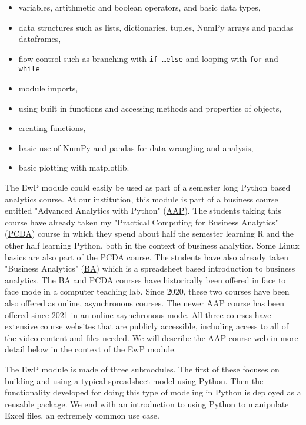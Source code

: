 \documentclass[ited,blindrev]{informs3}              %
\begin{document}
\begin{itemize}
	\item variables, artithmetic and boolean operators, and basic data types,
	\item data structures such as lists, dictionaries, tuples, NumPy arrays and pandas dataframes,
	\item flow control such as branching with \texttt{if \ldots else} and looping with \texttt{for} and \texttt{while}
	\item module imports,
	\item using built in functions and accessing methods and properties of objects,
	\item creating functions,
	\item basic use of NumPy and pandas for data wrangling and analysis,
	\item basic plotting with matplotlib.
\end{itemize}

The EwP module could easily be used as part of a semester long Python based analytics course. At our institution, this module is part of a business course entitled "Advanced Analytics with Python" (\href{http://www.sba.oakland.edu/faculty/isken/courses/mis6900}{AAP}). The students taking this course have already taken my "Practical Computing for Business Analytics" (\href{http://www.sba.oakland.edu/faculty/isken/courses/mis5470}{PCDA}) course in which they spend about half the semester learning R and the other half learning Python, both in the context of business analytics. Some Linux basics are also part of the PCDA course. The students have also already taken "Business Analytics" (\href{http://www.sba.oakland.edu/faculty/isken/courses/mis5460}{BA}) which is a spreadsheet based introduction to business analytics. The BA and PCDA courses have historically been offered in face to face mode in a computer teaching lab. Since 2020, these two courses have been also offered as online, asynchronous courses. The newer AAP course has been offered since 2021 in an online asynchronous mode. All three courses have extensive course websites that are publicly accessible, including access to all of the video content and files needed. We will describe the AAP course web in more detail below in the context of the EwP module.

The EwP module is made of three submodules. The first of these focuses on building and using a typical spreadsheet model using Python. Then the functionality developed for doing this type of modeling in Python is deployed as a reusable package. We end with an introduction to using Python to manipulate Excel files, an extremely common use case.
\end{document}
